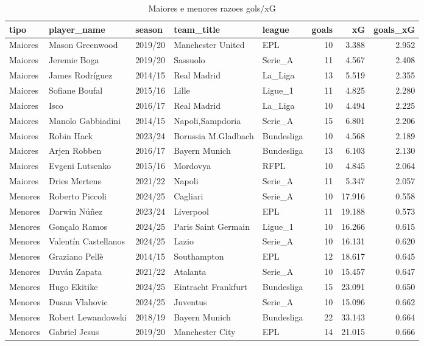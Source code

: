 \begin{table}

\caption{\label{tab:extremos_g10}Maiores e menores razoes gols/xG}
\centering
\begin{tabular}[t]{lllllrrr}
\toprule
tipo & player\_name & season & team\_title & league & goals & xG & goals\_xG\\
\midrule
Maiores & Mason Greenwood & 2019/20 & Manchester United & EPL & 10 & 3.388 & 2.952\\
Maiores & Jeremie Boga & 2019/20 & Sassuolo & Serie\_A & 11 & 4.567 & 2.408\\
Maiores & James Rodríguez & 2014/15 & Real Madrid & La\_Liga & 13 & 5.519 & 2.355\\
Maiores & Sofiane Boufal & 2015/16 & Lille & Ligue\_1 & 11 & 4.825 & 2.280\\
Maiores & Isco & 2016/17 & Real Madrid & La\_Liga & 10 & 4.494 & 2.225\\
\addlinespace
Maiores & Manolo Gabbiadini & 2014/15 & Napoli,Sampdoria & Serie\_A & 15 & 6.801 & 2.206\\
Maiores & Robin Hack & 2023/24 & Borussia M.Gladbach & Bundesliga & 10 & 4.568 & 2.189\\
Maiores & Arjen Robben & 2016/17 & Bayern Munich & Bundesliga & 13 & 6.103 & 2.130\\
Maiores & Evgeni Lutsenko & 2015/16 & Mordovya & RFPL & 10 & 4.845 & 2.064\\
Maiores & Dries Mertens & 2021/22 & Napoli & Serie\_A & 11 & 5.347 & 2.057\\
\addlinespace
Menores & Roberto Piccoli & 2024/25 & Cagliari & Serie\_A & 10 & 17.916 & 0.558\\
Menores & Darwin Núñez & 2023/24 & Liverpool & EPL & 11 & 19.188 & 0.573\\
Menores & Gonçalo Ramos & 2024/25 & Paris Saint Germain & Ligue\_1 & 10 & 16.266 & 0.615\\
Menores & Valentín Castellanos & 2024/25 & Lazio & Serie\_A & 10 & 16.131 & 0.620\\
Menores & Graziano Pellè & 2014/15 & Southampton & EPL & 12 & 18.617 & 0.645\\
\addlinespace
Menores & Duván Zapata & 2021/22 & Atalanta & Serie\_A & 10 & 15.457 & 0.647\\
Menores & Hugo Ekitike & 2024/25 & Eintracht Frankfurt & Bundesliga & 15 & 23.091 & 0.650\\
Menores & Dusan Vlahovic & 2024/25 & Juventus & Serie\_A & 10 & 15.096 & 0.662\\
Menores & Robert Lewandowski & 2018/19 & Bayern Munich & Bundesliga & 22 & 33.143 & 0.664\\
Menores & Gabriel Jesus & 2019/20 & Manchester City & EPL & 14 & 21.015 & 0.666\\
\bottomrule
\end{tabular}
\end{table}
